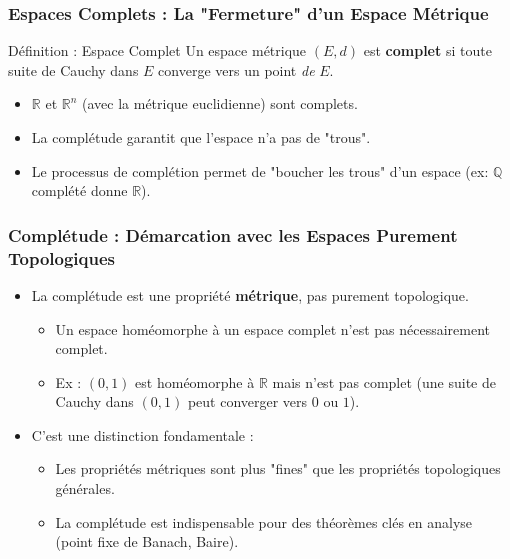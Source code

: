 \documentclass{beamer}
\begin{document}
\begin{frame}
    \frametitle{Espaces Complets : La "Fermeture" d'un Espace Métrique}
    \begin{block}{Définition : Espace Complet}
        Un espace métrique $(E, d)$ est \textbf{complet} si toute suite de Cauchy dans $E$ converge vers un point \textit{de} $E$.
    \end{block}
    \begin{itemize}
        \item $\mathbb{R}$ et $\mathbb{R}^n$ (avec la métrique euclidienne) sont complets.
        \item La complétude garantit que l'espace n'a pas de "trous".
        \item Le processus de complétion permet de "boucher les trous" d'un espace (ex: $\mathbb{Q}$ complété donne $\mathbb{R}$).
    \end{itemize}
\end{frame}

\begin{frame}
    \frametitle{Complétude : Démarcation avec les Espaces Purement Topologiques}
    \begin{itemize}
        \item La complétude est une propriété \textbf{métrique}, pas purement topologique.
            \begin{itemize}
                \item Un espace homéomorphe à un espace complet n'est pas nécessairement complet.
                \item Ex : $(0,1)$ est homéomorphe à $\mathbb{R}$ mais n'est pas complet (une suite de Cauchy dans $(0,1)$ peut converger vers $0$ ou $1$).
            \end{itemize}
        \item C'est une distinction fondamentale :
            \begin{itemize}
                \item Les propriétés métriques sont plus "fines" que les propriétés topologiques générales.
                \item La complétude est indispensable pour des théorèmes clés en analyse (point fixe de Banach, Baire).
            \end{itemize}
    \end{itemize}
\end{frame}

\end{document}
